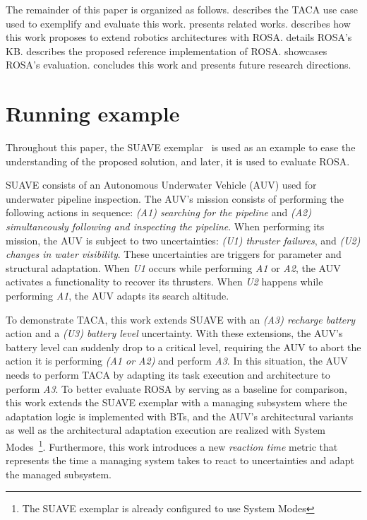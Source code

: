 The remainder of this paper is organized as follows.  describes the TACA use case used to exemplify and evaluate this work.  presents related works.  describes how this work proposes to extend robotics architectures with ROSA\@.  details ROSA's KB\@.  describes the proposed reference implementation of ROSA\@.  showcases ROSA's evaluation.  concludes this work and presents future research directions.

\section{Running example}\label{sec:rosa:example}
Throughout this paper, the SUAVE exemplar~\citep{suave} is used as an example to ease the understanding of the proposed solution, and later, it is used to evaluate ROSA\@.

SUAVE consists of an Autonomous Underwater Vehicle (AUV) used for underwater pipeline inspection. The AUV's mission consists of performing the following actions in sequence: \emph{(A1) searching for the pipeline} and \emph{(A2) simultaneously following and inspecting the pipeline}. When performing its mission, the AUV is subject to two uncertainties: \emph{(U1) thruster failures}, and \emph{(U2) changes in water visibility}. These uncertainties are triggers for parameter and structural adaptation. When \emph{U1} occurs while performing \emph{A1} or \emph{A2}, the AUV activates a functionality to recover its thrusters.
When \emph{U2} happens while performing \emph{A1}, the AUV adapts its search altitude.

To demonstrate TACA, this work extends SUAVE with an \emph{(A3) recharge battery} action and a \emph{(U3) battery level} uncertainty. With these extensions, the AUV's battery level can suddenly drop to a critical level, requiring the AUV to abort the action it is performing \emph{(A1 or A2)} and perform \emph{A3}. In this situation, the AUV needs to perform TACA by adapting its task execution and architecture to perform \emph{A3}.
To better evaluate ROSA by serving as a baseline for comparison, this work extends the SUAVE exemplar with a managing subsystem where the adaptation logic is implemented with BTs, and the AUV's architectural variants as well as the architectural adaptation execution are realized with System Modes~\citep{nordmannSystemModes2021}\footnote{The SUAVE exemplar is already configured to use System Modes}. Furthermore, this work introduces a new \emph{reaction time} metric that represents the time a managing system takes to react to uncertainties and adapt the managed subsystem.


